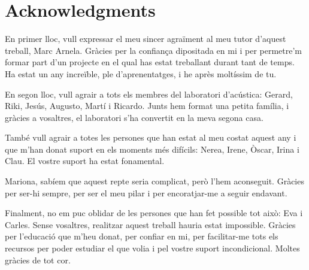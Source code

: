 
\begingroup
\let\clearpage\relax
\let\cleardoublepage\relax
\let\cleardoublepage\relax
\chapter*{Acknowledgments}

\vspace{0.5cm}

En primer lloc, vull expressar el meu sincer agraïment al meu tutor d'aquest treball, Marc Arnela. Gràcies per la confiança dipositada en mi i per permetre'm formar part d'un projecte en el qual has estat treballant durant tant de temps. Ha estat un any increïble, ple d'aprenentatges, i he après moltíssim de tu.

\vspace{0.5cm}

En segon lloc, vull agrair a tots els membres del laboratori d'acústica: Gerard, Riki, Jesús, Augusto, Martí i Ricardo. Junts hem format una petita família, i gràcies a vosaltres, el laboratori s'ha convertit en la meva segona casa.

\vspace{0.5cm}

També vull agrair a totes les persones que han estat al meu costat aquest any i que m'han donat suport en els moments més difícils: Nerea, Irene, Òscar, Irina i Clau. El vostre suport ha estat fonamental.

\vspace{0.5cm}
Mariona, sabíem que aquest repte seria complicat, però l'hem aconseguit. Gràcies per ser-hi sempre, per ser el meu pilar i per encoratjar-me a seguir endavant.

\vspace{0.5cm}

Finalment, no em puc oblidar de les persones que han fet possible tot això: Eva i Carles. Sense vosaltres, realitzar aquest treball hauria estat impossible. Gràcies per l'educació que m'heu donat, per confiar en mi, per facilitar-me tots els recursos per poder estudiar el que volia i pel vostre suport incondicional. Moltes gràcies de tot cor.


\endgroup



